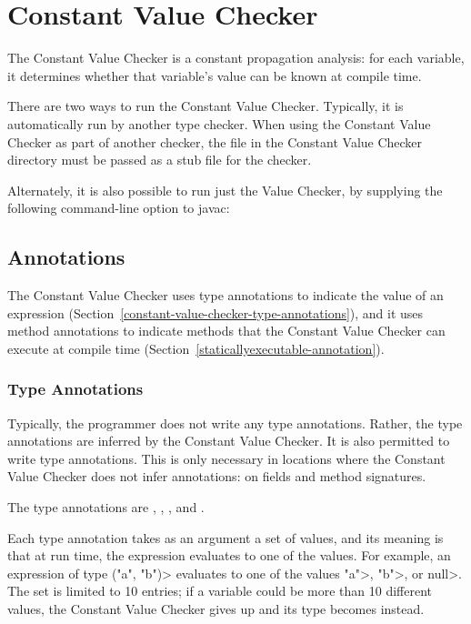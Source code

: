 \htmlhr
\chapter{Constant Value Checker\label{constant-value-checker}}

The Constant Value Checker is a constant propagation analysis: for
each variable, it determines whether that variable's value can be
known at compile time.

There are two ways to run the Constant Value Checker.
Typically, it is automatically run by another type checker.
When using the Constant Value Checker as part of another checker, the
 file in the Constant Value Checker directory must
be passed as a stub file for the checker.

Alternately, it is also possible to run just the Value Checker, by
supplying the following command-line option to javac:

\section{Annotations\label{constant-value-checker-annotations}}

The Constant Value Checker uses type annotations to indicate the value of
an expression (Section~\ref{constant-value-checker-type-annotations}), and
it uses method annotations to indicate methods that the Constant Value
Checker can execute at compile time
(Section~\ref{staticallyexecutable-annotation}).


\subsection{Type Annotations\label{constant-value-checker-type-annotations}}

Typically, the programmer does not write any type annotations.  Rather, the
type annotations are inferred by the Constant Value Checker.
It is also permitted to write type annotations.  This is only necessary in
locations where the Constant Value Checker does not infer annotations:  on fields
and method signatures.

The type annotations are
,
,
, and
.

Each type annotation takes as an argument a set of values, and its meaning
is that at run time, the expression evaluates to one of the values.  For
example, an expression of type
\<("a", "b")> evaluates to
one of the values \<"a">, \<"b">, or \<null>.
The set is limited to 10 entries; if a variable
could be more than 10 different values, the Constant Value
Checker gives up and its type becomes
 instead.

